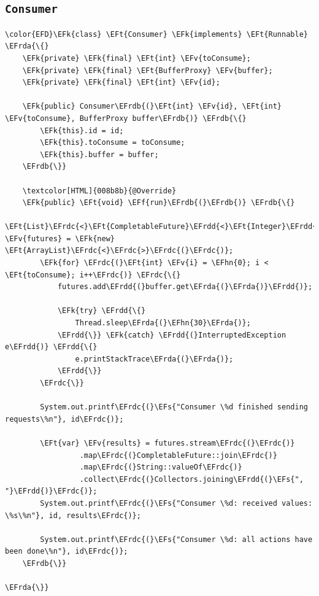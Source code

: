 \documentclass[11pt]{article}
\newcommand{\EFs}[1]{\textcolor{EFs}{#1}} %
\newcommand{\EFk}[1]{\textcolor{EFk}{#1}} %
\newcommand{\EFf}[1]{\textcolor{EFf}{#1}} %
\newcommand{\EFv}[1]{\textcolor{EFv}{#1}} %
\newcommand{\EFt}[1]{\textcolor{EFt}{#1}} %
\newcommand{\EFhn}[1]{\textcolor{EFhn}{#1}} %
\newcommand{\EFrda}[1]{\textcolor{EFrda}{#1}} %
\newcommand{\EFrdb}[1]{\textcolor{EFrdb}{#1}} %
\newcommand{\EFrdc}[1]{\textcolor{EFrdc}{#1}} %
\newcommand{\EFrdd}[1]{\textcolor{EFrdd}{#1}} %
\begin{document}
\subsection*{\texttt{Consumer}}
\label{sec:org0f531d9}
\begin{Code}
\begin{Verbatim}
\color{EFD}\EFk{class} \EFt{Consumer} \EFk{implements} \EFt{Runnable} \EFrda{\{}
    \EFk{private} \EFk{final} \EFt{int} \EFv{toConsume};
    \EFk{private} \EFk{final} \EFt{BufferProxy} \EFv{buffer};
    \EFk{private} \EFk{final} \EFt{int} \EFv{id};

    \EFk{public} Consumer\EFrdb{(}\EFt{int} \EFv{id}, \EFt{int} \EFv{toConsume}, BufferProxy buffer\EFrdb{)} \EFrdb{\{}
        \EFk{this}.id = id;
        \EFk{this}.toConsume = toConsume;
        \EFk{this}.buffer = buffer;
    \EFrdb{\}}

    \textcolor[HTML]{008b8b}{@Override}
    \EFk{public} \EFt{void} \EFf{run}\EFrdb{(}\EFrdb{)} \EFrdb{\{}
        \EFt{List}\EFrdc{<}\EFt{CompletableFuture}\EFrdd{<}\EFt{Integer}\EFrdd{>}\EFrdc{>} \EFv{futures} = \EFk{new} \EFt{ArrayList}\EFrdc{<}\EFrdc{>}\EFrdc{(}\EFrdc{)};
        \EFk{for} \EFrdc{(}\EFt{int} \EFv{i} = \EFhn{0}; i < \EFt{toConsume}; i++\EFrdc{)} \EFrdc{\{}
            futures.add\EFrdd{(}buffer.get\EFrda{(}\EFrda{)}\EFrdd{)};

            \EFk{try} \EFrdd{\{}
                Thread.sleep\EFrda{(}\EFhn{30}\EFrda{)};
            \EFrdd{\}} \EFk{catch} \EFrdd{(}InterruptedException e\EFrdd{)} \EFrdd{\{}
                e.printStackTrace\EFrda{(}\EFrda{)};
            \EFrdd{\}}
        \EFrdc{\}}

        System.out.printf\EFrdc{(}\EFs{"Consumer \%d finished sending requests\%n"}, id\EFrdc{)};

        \EFt{var} \EFv{results} = futures.stream\EFrdc{(}\EFrdc{)}
                 .map\EFrdc{(}CompletableFuture::join\EFrdc{)}
                 .map\EFrdc{(}String::valueOf\EFrdc{)}
                 .collect\EFrdc{(}Collectors.joining\EFrdd{(}\EFs{", "}\EFrdd{)}\EFrdc{)};
        System.out.printf\EFrdc{(}\EFs{"Consumer \%d: received values: \%s\%n"}, id, results\EFrdc{)};

        System.out.printf\EFrdc{(}\EFs{"Consumer \%d: all actions have been done\%n"}, id\EFrdc{)};
    \EFrdb{\}}

\EFrda{\}}
\end{Verbatim}
\end{Code}
\end{document}
